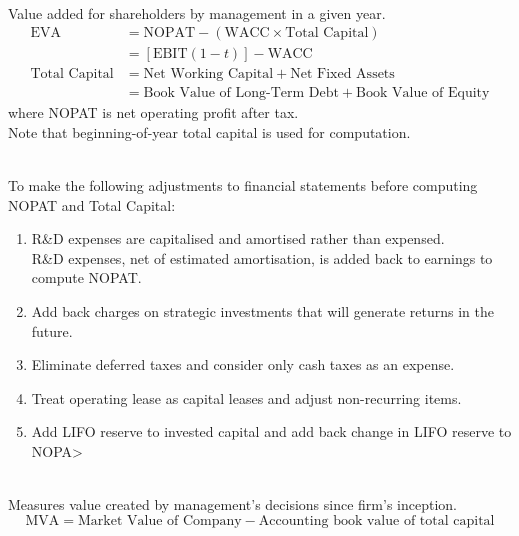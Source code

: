 \begin{definition} \\
Value added for shareholders by management in a given year.
\begin{align}
\text{EVA} &= \text{NOPAT} - (\text{WACC} \times \text{Total Capital}) \nonumber \\
&= [\text{EBIT}(1-t)] - \text{WACC} \nonumber \\
\text{Total Capital} &= \text{Net Working Capital} + \text{Net Fixed Assets} \nonumber \\
&= \text{Book Value of Long-Term Debt} + \text{Book Value of Equity} \nonumber
\end{align}
where NOPAT is net operating profit after tax.\\
Note that beginning-of-year total capital is used for computation.
\end{definition}

\begin{remark} \\
To make the following adjustments to financial statements before computing NOPAT and Total Capital:
\begin{enumerate}[label=\roman*.]
\setlength{\itemsep}{0pt}
\item R\&D expenses are capitalised and amortised rather than expensed.\\
R\&D expenses, net of estimated amortisation, is added back to earnings to compute NOPAT.
\item Add back charges on strategic investments that will generate returns in the future.
\item Eliminate deferred taxes and consider only cash taxes as an expense.
\item Treat operating lease as capital leases and adjust non-recurring items.
\item Add LIFO reserve to invested capital and add back change in LIFO reserve to NOPA>
\end{enumerate}
\end{remark}

\begin{definition} \\
Measures value created by management's decisions since firm's inception.
\begin{equation}
\text{MVA} = \text{Market Value of Company} - \text{Accounting book value of total capital} \nonumber
\end{equation}
\end{definition}

